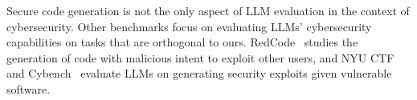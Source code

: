 Secure code generation is not the only aspect of LLM evaluation in the context of cybersecurity. 
Other benchmarks focus on evaluating LLMs' cybersecurity capabilities on tasks that are orthogonal to ours. 
RedCode~\citep{redcode} studies the generation of code with malicious intent to exploit other users, and NYU CTF~\citep{nyuctf} and Cybench~\citep{cybench} evaluate LLMs on generating security exploits given vulnerable software.
